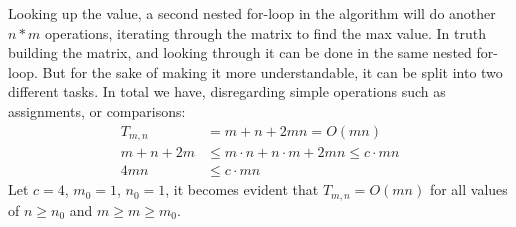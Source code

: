 \documentclass[10pt]{article}
\begin{document}
\begin{question}
\begin{enumerate}[a)]
        Looking up the value, a second nested for-loop in the algorithm will do another $n*m$ operations, iterating through the matrix to find the max value. In truth building the matrix, and looking through it can be done in the same nested for-loop. But for the sake of making it more understandable, it can be split into two different tasks.
        \newline \newline 
        In total we have, disregarding simple operations such as assignments, or comparisons:
        \begin{align*}
            T_{m,n} &= m + n + 2mn = O(mn) \\
            m + n + 2m &\leq m \cdot n + n \cdot m + 2mn \leq c \cdot mn\\
            4mn &\leq c \cdot mn
        \end{align*}
        Let $c=4$, $m_0 = 1$, $n_0 = 1$, it becomes evident that $T_{m,n} = O(mn)$ for all values of $n \geq n_0$ and $m \geq m \geq m_0$.
    \end{enumerate}

\end{question}
\newpage

\end{document}
